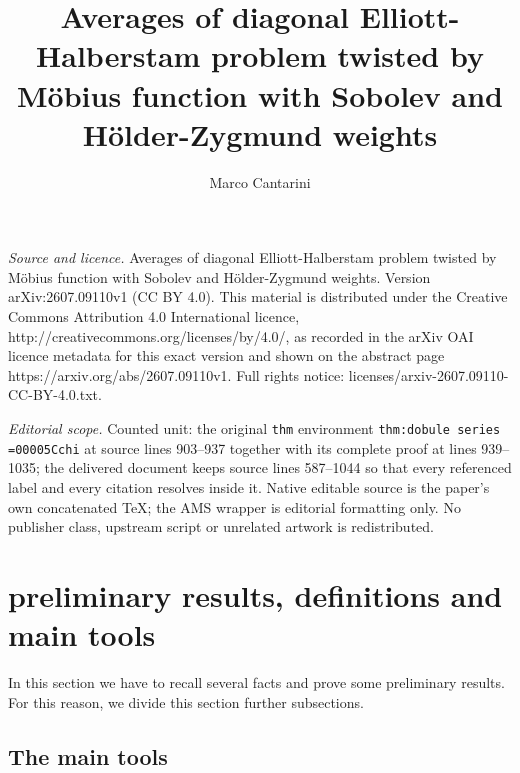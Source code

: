 \documentclass[10pt,a4paper]{amsart}
\numberwithin{equation}{section}
\numberwithin{figure}{section}
\begin{document}
\title[Averages of diagonal Elliott-Halberstam problem twisted by M]{Averages of diagonal Elliott-Halberstam problem twisted by M\"obius function with Sobolev and H\"older-Zygmund weights}
\author{Marco Cantarini}
\date{}
\maketitle
\noindent\emph{Source and licence.} Averages of diagonal Elliott-Halberstam problem twisted by M\"obius function with Sobolev and H\"older-Zygmund weights. Version arXiv:2607.09110v1 (CC BY 4.0). This material is distributed under the Creative Commons Attribution 4.0 International licence, http://creativecommons.org/licenses/by/4.0/, as recorded in the arXiv OAI licence metadata for this exact version and shown on the abstract page https://arxiv.org/abs/2607.09110v1. Full rights notice: licenses/arxiv-2607.09110-CC-BY-4.0.txt.\par\smallskip
\noindent\textit{Editorial scope.} Counted unit: the original \texttt{thm} environment \texttt{thm:dobule series =00005Cchi} at source lines 903--937 together with its complete proof at lines 939--1035; the delivered document keeps source lines 587--1044 so that every referenced label and every citation resolves inside it. Native editable source is the paper's own concatenated TeX; the AMS wrapper is editorial formatting only. No publisher class, upstream script or unrelated artwork is redistributed.
\section{preliminary results, definitions and main tools}

In this section we have to recall several facts and prove some preliminary
results. For this reason, we divide this section further subsections.

\subsection{The main tools}
\end{document}
